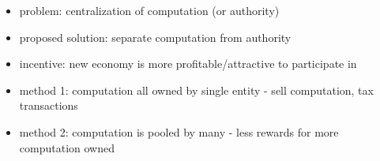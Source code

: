 \begin{itemize}
  \item problem: centralization of computation (or authority)
  \item proposed solution: separate computation from authority
  \item incentive: new economy is more profitable/attractive to participate in
  \item method 1: computation all owned by single entity - sell computation, tax transactions
  \item method 2: computation is pooled by many - less rewards for more computation owned
\end{itemize}